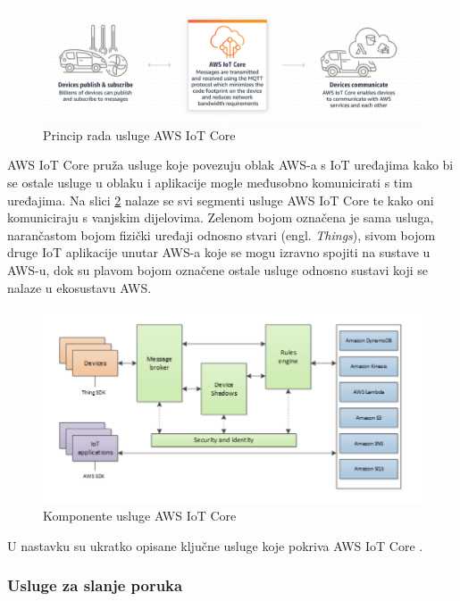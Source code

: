 \begin{figure}[ht]
	\centering
	\includegraphics[scale=0.6]{imgs/aws_iot_core_overview}
	\caption{Princip rada usluge AWS IoT Core \cite{aws_docs}}
	\label{fig:aws_iot_core_overview}
\end{figure}

AWS IoT Core pruža usluge koje povezuju oblak AWS-a s IoT uređajima kako bi se ostale usluge u oblaku i aplikacije mogle međusobno komunicirati s tim uređajima. Na slici \ref{fig:aws_iot_core_components} nalaze se svi segmenti usluge AWS IoT Core te kako oni komuniciraju s vanjskim dijelovima. Zelenom bojom označena je sama usluga, narančastom bojom fizički uređaji odnosno stvari (engl. \textit{Things}), sivom bojom druge IoT aplikacije unutar AWS-a koje se mogu izravno spojiti na sustave u AWS-u, dok su plavom bojom označene ostale usluge odnosno sustavi koji se nalaze u ekosustavu AWS.

\begin{figure}[ht]
	\centering
	\includegraphics[scale=0.6]{imgs/aws_iot_core_components}
	\caption{Komponente usluge AWS IoT Core \cite{aws_docs}}
	\label{fig:aws_iot_core_components}
\end{figure}

U nastavku su ukratko opisane ključne usluge koje pokriva AWS IoT Core \cite{aws_docs}.

\subsubsection{Usluge za slanje poruka}


